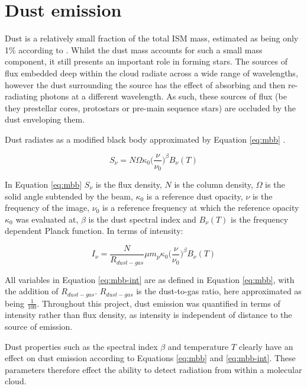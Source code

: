 \documentclass{report}
\begin{document}
\section{Dust emission}
Dust is a relatively small fraction of the total ISM mass, estimated as being only 1\% according to \textcite{noise}. Whilst the dust mass accounts for such a small mass component, it still presents an important role in forming stars. The sources of flux embedded deep within the cloud radiate across a wide range of wavelengths, however the dust surrounding the source has the effect of absorbing and then re-radiating photons at a different wavelength. As such, these sources of flux (be they prestellar cores, protostars or pre-main sequence stars) are occluded by the dust enveloping them.

Dust radiates as a modified black body approximated by Equation \ref{eq:mbb} \parencite{noise}.

\begin{equation} \label{eq:mbb}
  S_{\nu} = N \Omega \kappa_{0} \Big(\frac{\nu}{\nu_{0}}\Big)^{\beta} B_{\nu}(T)
\end{equation}

In Equation \ref{eq:mbb} $S_{\nu}$ is the flux density, $N$ is the column density, $\Omega$ is the solid angle subtended by the beam, $\kappa_{0}$ is a reference dust opacity, $\nu$ is the frequency of the image, $\nu_{0}$ is a reference frequency at which the reference opacity $\kappa_{0}$ was evaluated at, $\beta$ is the dust spectral index and $B_{\nu}(T)$ is the frequency dependent Planck function. In terms of intensity:

\begin{equation} \label{eq:mbb-int}
  I_{\nu} = \frac{N}{R_{dust-gas}} \mu m_{p} \kappa_{0} \Big(\frac{\nu}{\nu_{0}}\Big)^{\beta} B_{\nu}(T)
\end{equation}

All variables in Equation \ref{eq:mbb-int} are as defined in Equation \ref{eq:mbb}, with the addition of $R_{dust-gas}$. $R_{dust-gas}$ is the dust-to-gas ratio, here approximated as being $\frac{1}{100}$. Throughout this project, dust emission was quantified in terms of intensity rather than flux density, as intensity is independent of distance to the source of emission.

Dust properties such as the spectral index $\beta$ and temperature $T$ clearly have an effect on dust emission according to Equations \ref{eq:mbb} and \ref{eq:mbb-int}. These parameters therefore effect the ability to detect radiation from within a molecular cloud.
\end{document}
